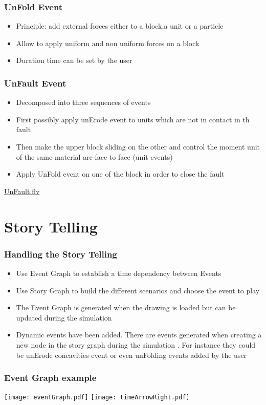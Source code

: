 \documentclass{beamer}
\begin{document}
	\begin{frame}
	\frametitle{UnFold Event}
	\begin{itemize}
	\item Principle: add external forces either to a block,a unit or a particle
	\item Allow to apply uniform and non uniform forces on a block
	\item Duration time can be set by the user
	\end{itemize}
	\end{frame}		
	

	\begin{frame}
	\frametitle{UnFault Event}
	\begin{itemize}
	\item Decomposed into three sequences of events
	\item First possibly apply unErode event to units which are not in contact in th fault
	\item Then make the upper block sliding on the other and control the moment unit of the same material are face to face
	(unit events)
	\item Apply UnFold event on one of the block in order to close the fault
	\end{itemize}
	\url{UnFault.flv}
	\end{frame}		
	
	
	\section{Story Telling}
	
	\begin{frame}
	\frametitle{Handling the Story Telling}
	\begin{itemize}
	\item Use Event Graph to establish a time dependency between Events
	\item Use Story Graph to build the different scenarios and choose the event to play
	\item The Event Graph is generated when the drawing is loaded but can be updated during the simulation
	\item Dynamic events have been added. There are events generated when creating a new node in the story graph during the simulation . For instance they could be unErode concavities event or even unFolding events added by the user
	\end{itemize}
	\end{frame}	
		
	\begin{frame} 
    \frametitle{Event Graph example}
    \texttt{[image: eventGraph.pdf]}
    \linebreak
    \linebreak
    \texttt{[image: timeArrowRight.pdf]}
    \end{frame}
    
\end{document}
